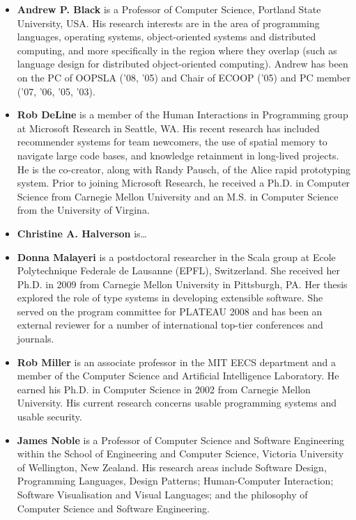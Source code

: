 \documentclass[authorpermission]{sigplanconf}
\begin{document}
\begin{itemize}

\item \textbf{Andrew P. Black} is a Professor of Computer Science,
  Portland State University, USA. His research interests are in the
  area of programming languages, operating systems, object-oriented
  systems and distributed computing, and more specifically in the
  region where they overlap (such as language design for distributed
  object-oriented computing). Andrew has been on the PC of OOPSLA
  ('08, '05) and Chair of ECOOP ('05) and PC member ('07, '06, '05,
  '03).

\item 
\textbf{Rob DeLine} is a member of the Human Interactions in Programming
group at Microsoft Research in Seattle, WA. His recent research has included
recommender systems for team newcomers, the use of spatial memory to navigate 
large code bases, and knowledge retainment in long-lived projects. He is the
co-creator, along with Randy Pausch, of the Alice rapid prototyping system.
Prior to joining Microsoft Research, he received a Ph.D. in Computer Science
from Carnegie Mellon University and an M.S. in Computer Science
from the University of Virgina.

\item
\textbf{Christine A. Halverson} is\ldots

\item
\textbf{Donna Malayeri} is a postdoctoral researcher in the Scala group at 
Ecole Polytechnique Federale de Lausanne (EPFL), Switzerland. She received her 
Ph.D. in 2009 from Carnegie Mellon University in Pittsburgh, PA. Her thesis explored 
the role of type systems in developing extensible software. She served on the 
program committee for PLATEAU 2008 and has been an  external reviewer for a 
number of international top-tier conferences and journals.

\item \textbf{Rob Miller} is an associate professor in the MIT EECS department 
and a member of the Computer Science and Artificial Intelligence Laboratory. He 
earned his Ph.D. in Computer Science in 2002 from Carnegie Mellon University. 
His current research concerns usable programming systems and usable security.

\item \textbf{James Noble} is a Professor of Computer Science and
  Software Engineering within the School of Engineering and Computer
  Science, Victoria University of Wellington, New Zealand.  His
  research areas include Software Design, Programming Languages,
  Design Patterns; Human-Computer Interaction; Software Visualisation
  and Visual Languages; and the philosophy of Computer Science and
  Software Engineering. 


\end{itemize}
\end{document}
